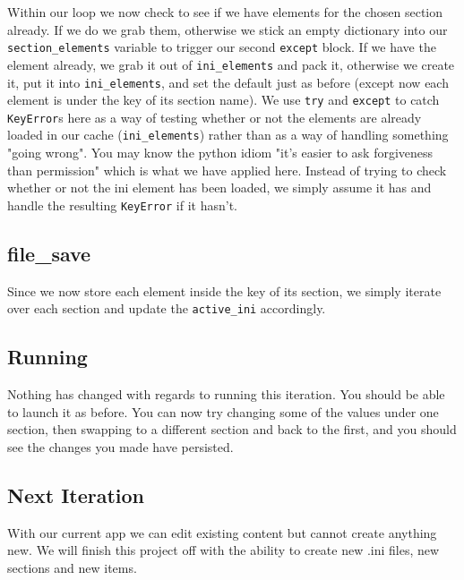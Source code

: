\documentclass[a4paper,11pt,openany]{book}
\begin{document}
\vspace{5mm}

Within our loop we now check to see if we have elements for the chosen section already. If we do we grab them, otherwise we stick an empty dictionary into our \lstinline[columns=fixed]{section_elements} variable to trigger our second \lstinline[columns=fixed]{except} block. If we have the element already, we grab it out of \lstinline[columns=fixed]{ini_elements} and pack it, otherwise we create it, put it into \lstinline[columns=fixed]{ini_elements}, and set the default just as before (except now each element is under the key of its section name). We use \lstinline[columns=fixed]{try} and \lstinline[columns=fixed]{except} to catch \lstinline[columns=fixed]{KeyError}s here as a way of testing whether or not the elements are already loaded in our cache (\lstinline[columns=fixed]{ini_elements}) rather than as a way of handling something "going wrong". You may know the python idiom "it's easier to ask forgiveness than permission" which is what we have applied here. Instead of trying to check whether or not the ini element has been loaded, we simply assume it has and handle the resulting \lstinline[columns=fixed]{KeyError} if it hasn't.

\subsection{file\_save}

Since we now store each element inside the key of its section, we simply iterate over each section and update the \lstinline[columns=fixed]{active_ini} accordingly. 

\subsection{Running}

Nothing has changed with regards to running this iteration. You should be able to launch it as before. You can now try changing some of the values under one section, then swapping to a different section and back to the first, and you should see the changes you made have persisted. 

\subsection{Next Iteration}
With our current app we can edit existing content but cannot create anything new. We will finish this project off with the ability to create new .ini files, new sections and new items.
\end{document}
